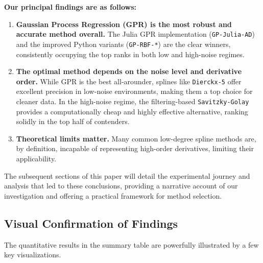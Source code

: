 \textbf{Our principal findings are as follows:}

\begin{enumerate}
    \item \textbf{Gaussian Process Regression (GPR) is the most robust and accurate method overall.} The Julia GPR implementation (\texttt{GP-Julia-AD}) and the improved Python variants (\texttt{GP-RBF-*}) are the clear winners, consistently occupying the top ranks in both low and high-noise regimes.
    \item \textbf{The optimal method depends on the noise level and derivative order.} While GPR is the best all-arounder, splines like \texttt{Dierckx-5} offer excellent precision in low-noise environments, making them a top choice for cleaner data. In the high-noise regime, the filtering-based \texttt{Savitzky-Golay} provides a computationally cheap and highly effective alternative, ranking solidly in the top half of contenders.
    \item \textbf{Theoretical limits matter.} Many common low-degree spline methods are, by definition, incapable of representing high-order derivatives, limiting their applicability.
\end{enumerate}

The subsequent sections of this paper will detail the experimental journey and analysis that led to these conclusions, providing a narrative account of our investigation and offering a practical framework for method selection.

\subsection{Visual Confirmation of Findings}

The quantitative results in the summary table are powerfully illustrated by a few key visualizations.


